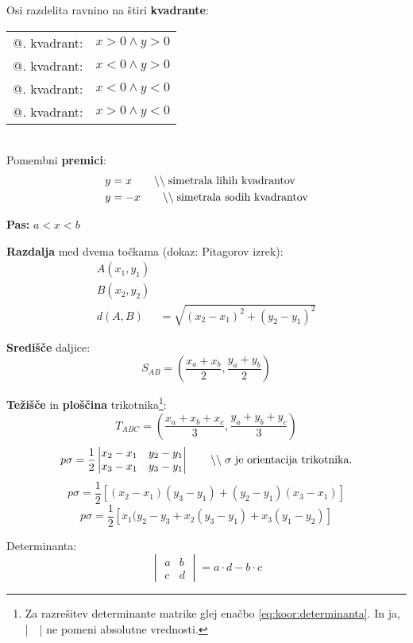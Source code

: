 \documentclass[a4paper,oneside,12pt,fleqn]{article}
\makeatletter
\newcommand\krat\cdot
\newcommand{\comment}[1]{\ensuremath{\qquad\backslash\backslash\;}\textnormal{#1}}
\newcommand{\Rom}[1]{\expandafter\@slowromancap\romannumeral #1@}
\numberwithin{equation}{section}
\makeatother
\begin{document}
Osi razdelita ravnino na štiri \textbf{kvadrante}: \\[3pt]
\begin{tabular}{ll}
  \Rom{1}. kvadrant: & $x > 0 \land y > 0$ \\
  \Rom{2}. kvadrant: & $x < 0 \land y > 0$ \\
  \Rom{3}. kvadrant: & $x < 0 \land y < 0$ \\
  \Rom{4}. kvadrant: & $x > 0 \land y < 0$ \\
\end{tabular}
\\
Pomembni \textbf{premici}:
\begin{align*}
  y &= x  \comment{simetrala lihih kvadrantov} \\
  y &= -x \comment{simetrala sodih kvadrantov}
\end{align*}

\textbf{Pas:} $a < x < b$

\textbf{Razdalja} med dvema točkama (dokaz: Pitagorov izrek):
\begin{align*}
  A(x_1, y_1) \\
  B(x_2, y_2) \\
  d(A,B) &= \sqrt{\left( x_2 - x_1 \right)^2 + \left( y_2 - y_1 \right)^2}
\end{align*}

\textbf{Središče} daljice:
\[ S_{AB} = \left( \frac{x_a+x_b}{2}, \frac{y_a+y_b}{2} \right) \]

\textbf{Težišče} in \textbf{ploščina} trikotnika\footnote{Za razrešitev
determinante matrike glej enačbo \eqref{eq:koor:determinanta}. In ja, |\ \ | ne pomeni absolutne
vrednosti.}:
\[ T_{ABC} = \left( \frac{x_a+x_b+x_c}{3},\frac{y_a+y_b+y_c}{3} \right) \]
\[ p\sigma = \frac{1}{2} \begin{vmatrix}
    x_2 - x_1 & y_2 - y_1 \\
    x_3 - x_1 & y_3 - y_1
\end{vmatrix} \comment{$\sigma$ je orientacija trikotnika.} \]
\[ p\sigma = \frac{1}{2} \left[ (x_2-x_1)(y_3-y_1) + (y_2-y_1)(x_3-x_1) \right] \]
\[ p\sigma = \frac{1}{2} \left[ x_1(y_2-y_3 + x_2(y_3-y_1) + x_3(y_1-y_2) \right] \]

Determinanta:
\begin{equation}
  \begin{vmatrix}
    a & b \\
    c & d
  \end{vmatrix} = a \krat d - b \krat c
  \label{eq:koor:determinanta}
\end{equation}
\end{document}
